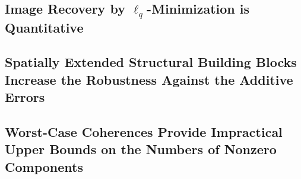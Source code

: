 \subsection{Image Recovery by $\ell_{q}$-Minimization is Quantitative}
\label{subsec:discussion_benefits_lq_minimization}


\subsection{Spatially Extended Structural Building Blocks Increase the Robustness Against the Additive Errors}
\label{subsec:discussion_robustness_additive_errors}


\subsection{Worst-Case Coherences Provide Impractical Upper Bounds on the Numbers of Nonzero Components}


